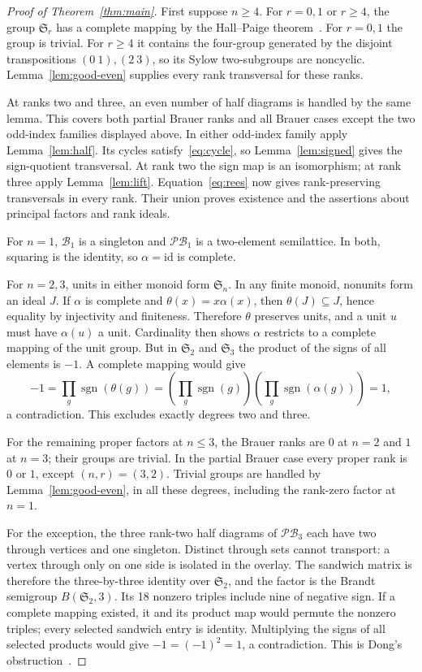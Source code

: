\documentclass[11pt,a4paper]{article}
\newcommand{\B}{\mathcal B}
\newcommand{\PB}{\mathcal{PB}}
\newcommand{\Sym}{\mathfrak S}
\newcommand{\sgn}{\operatorname{sgn}}
\begin{document}
\begin{proof}[Proof of Theorem~\ref{thm:main}]
First suppose $n\ge4$. For $r=0,1$ or $r\ge4$, the group $\Sym_r$ has a complete mapping by the Hall--Paige theorem~\cite[Theorem~1.1]{ABCHK}. For $r=0,1$ the group is trivial. For $r\ge4$ it contains the four-group generated by the disjoint transpositions $(0\ 1),(2\ 3)$, so its Sylow two-subgroups are noncyclic. Lemma~\ref{lem:good-even} supplies every rank transversal for these ranks.

At ranks two and three, an even number of half diagrams is handled by the same lemma. This covers both partial Brauer ranks and all Brauer cases except the two odd-index families displayed above. In either odd-index family apply Lemma~\ref{lem:half}. Its cycles satisfy~\eqref{eq:cycle}, so Lemma~\ref{lem:signed} gives the sign-quotient transversal. At rank two the sign map is an isomorphism; at rank three apply Lemma~\ref{lem:lift}. Equation~\eqref{eq:rees} now gives rank-preserving transversals in every rank. Their union proves existence and the assertions about principal factors and rank ideals.

For $n=1$, $\B_1$ is a singleton and $\PB_1$ is a two-element semilattice. In both, squaring is the identity, so $\alpha=\mathrm{id}$ is complete.

For $n=2,3$, units in either monoid form $\Sym_n$. In any finite monoid, nonunits form an ideal $J$. If $\alpha$ is complete and $\theta(x)=x\alpha(x)$, then $\theta(J)\subseteq J$, hence equality by injectivity and finiteness. Therefore $\theta$ preserves units, and a unit $u$ must have $\alpha(u)$ a unit. Cardinality then shows $\alpha$ restricts to a complete mapping of the unit group. But in $\Sym_2$ and $\Sym_3$ the product of the signs of all elements is $-1$. A complete mapping would give
\[
 -1=\prod_g\sgn(\theta(g))=
 \left(\prod_g\sgn(g)\right)\left(\prod_g\sgn(\alpha(g))\right)=1,
\]
a contradiction. This excludes exactly degrees two and three.

For the remaining proper factors at $n\le3$, the Brauer ranks are $0$ at $n=2$ and $1$ at $n=3$; their groups are trivial. In the partial Brauer case every proper rank is $0$ or $1$, except $(n,r)=(3,2)$. Trivial groups are handled by Lemma~\ref{lem:good-even}, in all these degrees, including the rank-zero factor at $n=1$.

For the exception, the three rank-two half diagrams of $\PB_3$ each have two through vertices and one singleton. Distinct through sets cannot transport: a vertex through only on one side is isolated in the overlay. The sandwich matrix is therefore the three-by-three identity over $\Sym_2$, and the factor is the Brandt semigroup $B(\Sym_2,3)$. Its 18 nonzero triples include nine of negative sign. If a complete mapping existed, it and its product map would permute the nonzero triples; every selected sandwich entry is identity. Multiplying the signs of all selected products would give $-1=(-1)^2=1$, a contradiction. This is Dong's obstruction~\cite[Proposition~6.2]{Dong}.


\end{proof}
\end{document}
